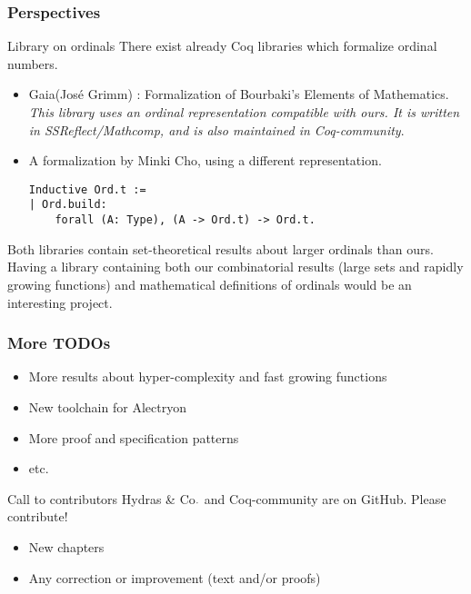 \documentclass[10pt]{beamer}
\newcommand{\coq}{Coq\xspace}
\newcommand{\community}{Coq-community\xspace}
\newcommand{\gaia}{Gaia\xspace}
\newcommand{\alectr}{Alectryon\xspace}
\newcommand{\Hydras}{Hydras \& Co$\text.$\xspace}
\begin{document}
\begin{frame}[fragile]
  \frametitle{Perspectives}
  \begin{block}{Library on ordinals}
    There exist already \coq libraries which formalize ordinal numbers.
    \begin{itemize}
    \item \gaia (José Grimm) : Formalization of Bourbaki's Elements of Mathematics. {\color{lookcolor}\emph{This library uses an ordinal representation compatible with ours. It is  written in SSReflect/Mathcomp, and is also maintained in \community}.}
    \item A formalization by Minki Cho, using a different representation.
{\color{darkorange}
\begin{verbatim}
Inductive Ord.t :=
| Ord.build: 
    forall (A: Type), (A -> Ord.t) -> Ord.t.
\end{verbatim}
}  
    \end{itemize}

    Both libraries contain set-theoretical results about larger ordinals than ours. Having a library containing both our combinatorial results (large sets and rapidly growing functions) and mathematical definitions of ordinals would be an interesting project.
  \end{block}
\end{frame}





\begin{frame}
  \frametitle{More TODOs}
  \begin{block}{}
    \begin{itemize}
    \item More results about hyper-complexity and fast growing functions
    \item New toolchain for \alectr
    \item More proof and specification patterns
    \item etc.
    \end{itemize}
  \end{block}

  \begin{block}{Call to contributors }
  {\color{plugincolor}\Hydras} and  {\color{plugincolor}\community} are on GitHub. Please contribute!
      \begin{itemize}
      \item New chapters
      \item Any correction or improvement (text and/or proofs)
        
  
    \end{itemize}
     \end{block}
 
  
\end{frame}
\end{document}
